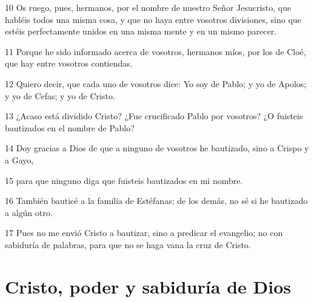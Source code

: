 \par 10 Os ruego, pues, hermanos, por el nombre de nuestro Señor Jesucristo, que habléis todos una misma cosa, y que no haya entre vosotros divisiones, sino que estéis perfectamente unidos en una misma mente y en un mismo parecer.
\par 11 Porque he sido informado acerca de vosotros, hermanos míos, por los de Cloé, que hay entre vosotros contiendas.
\par 12 Quiero decir, que cada uno de vosotros dice: Yo soy de Pablo; y yo de Apolos; y yo de Cefas; y yo de Cristo.
\par 13 ¿Acaso está dividido Cristo? ¿Fue crucificado Pablo por vosotros? ¿O fuisteis bautizados en el nombre de Pablo?
\par 14 Doy gracias a Dios de que a ninguno de vosotros he bautizado, sino a Crispo y a Gayo,
\par 15 para que ninguno diga que fuisteis bautizados en mi nombre.
\par 16 También bauticé a la familia de Estéfanas; de los demás, no sé si he bautizado a algún otro.
\par 17 Pues no me envió Cristo a bautizar, sino a predicar el evangelio; no con sabiduría de palabras, para que no se haga vana la cruz de Cristo.

\section*{Cristo, poder y sabiduría de Dios}

